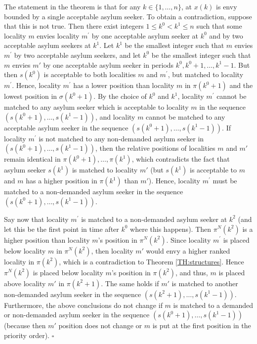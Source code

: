 \documentclass[12pt,fleqn]{article}
\begin{document}
The statement in the theorem is that for any $k\in \{1,\ldots,n\}$, at $x(k)$ is envy bounded by a single acceptable asylum seeker. To obtain a contradiction, suppose that this is not true. Then there exist integers $1\leq k^0 <k^1\leq n$ such that some locality $m$ envies locality $m^\prime$ by one acceptable asylum seeker at $k^0$ and by two acceptable asylum seekers at $k^1$. Let $k^1$ be the smallest integer such that $m$ envies $m^\prime$ by two acceptable asylum seekers, and let $k^0$ be the smallest integer such that $m$ envies $m'$ by one acceptable asylum seeker in periods $k^0,k^0+1,\ldots,k^1-1$.
But then $s(k^0)$ is acceptable to both localities $m$ and $m^\prime$, but matched to locality $m^\prime$. Hence, locality $m^\prime$ has a lower position than locality $m$ in $\pi(k^0+1)$ and the lowest position in $\sigma(k^0+1)$. By the choice of $k^0$ and $k^1$, locality $m^\prime$ cannot be matched to any asylum seeker which is acceptable to locality $m$ in the sequence $(s(k^0+1),\ldots,s(k^1-1))$, and locality $m$ cannot be matched to any acceptable asylum seeker in the sequence $(s(k^0+1),\ldots,s(k^1-1))$. If locality $m^\prime$ is not matched to any non-demanded asylum seeker in $(s(k^0+1),\ldots,s(k^1-1))$, then the relative positions of localities $m$ and $m'$ remain identical in $\pi(k^0+1),\ldots,\pi(k^1)$, which contradicts the fact that asylum seeker $s(k^1)$ is matched to locality $m'$ (but $s(k^1)$ is acceptable to $m$ and $m$ has a higher position in $\pi(k^1)$ than $m'$). Hence, locality $m^\prime$ must be matched to a non-demanded asylum seeker in the sequence $(s(k^0+1),\ldots,s(k^1-1))$.

Say now that locality $m^\prime$ is matched to a non-demanded asylum seeker at $k^2$ (and let this be the first point in time after $k^0$ where this happens). Then $\pi^N(k^2)$ is a higher position than locality $m$'s position in $\pi^N(k^2)$. Since locality $m^\prime$ is placed below locality $m$ in $\pi^N(k^2)$, then locality $m'$ would envy a higher ranked locality in $\pi(k^2)$, which is a contradiction to Theorem \ref{TH:structures}. Hence $\pi^N(k^2)$ is placed below locality $m$'s position in $\pi(k^2)$, and thus, $m$ is placed above locality $m'$ in $\pi(k^2+1)$. The same holds if $m'$ is matched to another non-demanded asylum seeker in the sequence $(s(k^2+1),\ldots,s(k^1-1))$. Furthermore, the above conclusions do not change if $m$ is matched to a demanded or non-demanded asylum seeker in the sequence $(s(k^0+1),\ldots,s(k^1-1))$ (because then $m'$ position does not change or $m$ is put at the first position in the priority order). \hfill$\square$
\end{document}
